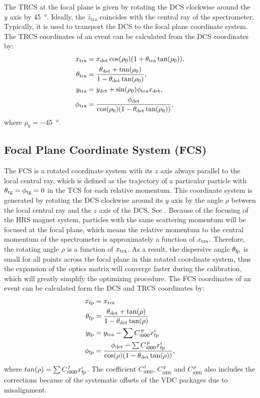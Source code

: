 The TRCS at the focal plane is given by rotating the DCS clockwise around the $y$ axis by \SI{45}{\degree}. Ideally, the $\hat{z}_{\mathrm{tra}}$ coincides with the central ray of the spectrometer. Typically, it is used to transport the DCS to the focal plane coordinate system. The TRCS coordinates of an event can be calculated from the DCS coordinates by:
\begin{align} \label{C6S1E1}
x_{\mathrm{tra}} & = x_{\mathrm{det}}\cos(\rho_0)(1+\theta_{\mathrm{tra}}\tan(\rho_0)), \\  \label{C6S1E2}
\theta_{\mathrm{tra}} & = \frac{\theta_{\mathrm{det}}+\tan(\rho_0)}{1-\theta_{\mathrm{det}}\tan(\rho_0)}, \\  \label{C6S1E3}
y_{\mathrm{tra}} & = y_{\mathrm{det}}+\sin(\rho_0)\phi_{\mathrm{tra}}x_{\mathrm{det}}, \\ \label{C6S1E4}
\phi_{\mathrm{tra}} & = \frac{\phi_{\mathrm{det}}}{\cos(\rho_0)(1-\theta_{\mathrm{det}}\tan(\rho_0))},
\end{align}
where $\rho_0=-$\SI{45}{\degree}.

\subsection[Focal Plane Coordinate System]{Focal Plane Coordinate System (FCS)}

The FCS is a rotated coordinate system with its $z$ axis always parallel to the local central ray, which is defined as the trajectory of a particular particle with $\theta_{\mathrm{tg}}=\phi_{\mathrm{tg}}=0$ in the TCS for each relative momentum. This coordinate system is generated by rotating the DCS clockwise around its $y$ axis by the angle $\rho$ between the local central ray and the $z$ axis of the DCS. See . Because of the focusing of the HRS magnet system, particles with the same scattering momentum will be focused at the focal plane, which means the relative momentum to the central momentum of the spectrometer is approximately a function of $x_{\mathrm{tra}}$. Therefore, the rotating angle $\rho$ is a function of $x_{\mathrm{tra}}$. As a result, the dispersive angle $\theta_{\mathrm{fp}}$ is small for all points across the focal plane in this rotated coordinate system, thus the expansion of the optics matrix will converge faster during the calibration, which will greatly simplify the optimizing procedure. The FCS coordinates of an event can be calculated form the DCS and TRCS coordinates by:
\begin{align} \label{C6S1E5}
x_{\mathrm{fp}} & = x_{\mathrm{tra}} \\ \label{C6S1E6}
\theta_{\mathrm{fp}} & = \frac{\theta_{\mathrm{det}}+\tan(\rho)}{1-\theta_{\mathrm{det}}\tan(\rho)} \\ \label{C6S1E7}
y_{\mathrm{fp}} & = y_{\mathrm{tra}}-\sum C_{i000}^{\,y} x_{\mathrm{fp}}^i \\ \label{C6S1E8}
\phi_{\mathrm{fp}} & = \frac{\phi_{\mathrm{det}}-\sum C_{i000}^{\,p}x_{\mathrm{fp}}^i}{\cos(\rho)(1-\theta_{\mathrm{det}}\tan(\rho))},
\end{align}
where $tan(\rho) = \sum C_{i000}^{\,t} x_{\mathrm{fp}}^i$. The coefficient $C_{i000}^{\,t}$, $C_{i000}^{\,y}$ and $C_{i000}^{\,p}$ also includes the corrections because of the systematic offsets of the VDC packages due to misalignment.

